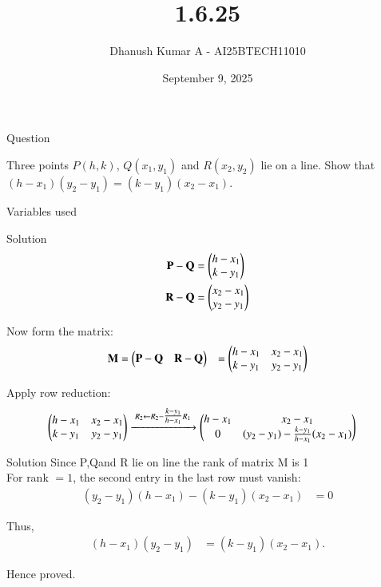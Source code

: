 \documentclass{beamer}
\title 
{1.6.25}
\date{September 9, 2025}
\author 
{Dhanush Kumar A - AI25BTECH11010}
\begin{document}
\frame{\titlepage}
\begin{frame}{Question}
 
Three points \(P(h, k)\), \(Q(x_1, y_1)\) and \(R(x_2, y_2)\) lie on a line. Show that 
\((h-x_1)(y_2-y_1) = (k-y_1)(x_2-x_1)\).

\end{frame}
\begin{frame}{Variables used}
\begin{table}[H]    
  \centering
  
  \caption{Variables Used}
  \label{tab:1.6.25}
\end{table}
\end{frame}
\begin{frame}{Solution}
\begin{align}
\mathbf{P}-\mathbf{Q} &= \begin{pmatrix}h-x_1 \\ k-y_1\end{pmatrix} \\
\mathbf{R}-\mathbf{Q} &= \begin{pmatrix}x_2-x_1 \\ y_2-y_1\end{pmatrix}
\end{align}

Now form the matrix:
\begin{align}
	\mathbf{M} &=\begin{pmatrix}\mathbf{P}-\mathbf{Q} & \mathbf{R}-\mathbf{Q}\end{pmatrix} &=\begin{pmatrix}h-x_1 & x_2-x_1 \\ k-y_1 & y_2-y_1\end{pmatrix}
\end{align}

Apply row reduction:
\begin{align}
\begin{pmatrix}h-x_1 & x_2-x_1 \\ k-y_1 & y_2-y_1\end{pmatrix}
&\xrightarrow{\;R_2 \leftarrow R_2 - \tfrac{k-y_1}{h-x_1}R_1\;}
\begin{pmatrix}h-x_1 & x_2-x_1 \\ 0 & (y_2-y_1) - \tfrac{k-y_1}{h-x_1}(x_2-x_1)\end{pmatrix}
\end{align}
\end{frame}
	\begin{frame}{Solution}
Since P,Qand R lie on line the rank of matrix M is 1\\
For rank \(=1\), the second entry in the last row must vanish:
\begin{align}
(y_2-y_1)(h-x_1) - (k-y_1)(x_2-x_1) &= 0
\end{align}

Thus,
\begin{align}
(h-x_1)(y_2-y_1) &= (k-y_1)(x_2-x_1).
\end{align}

Hence proved.

\end{frame}
\end{document}
